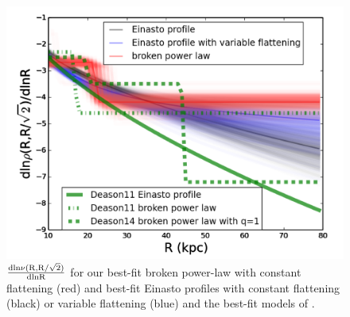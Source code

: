 \documentclass[12pt,preprint]{aastex}
\begin{document}
\begin{figure}[htbp]
\centering
\includegraphics[width=\textwidth]{combinexueanddeason}
\caption{$\rm \frac{dln\nu(R,R/\sqrt{2})}{dlnR}$ for our best-fit broken power-law with constant flattening (red) and best-fit Einasto profiles with constant flattening (black) or variable flattening (blue) and the best-fit models of \citet[green]{Deason2011,Deason2014}.}
\label{f:fdensitycompare}
\end{figure}
\end{document}
